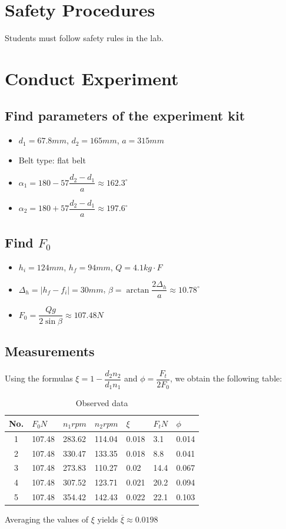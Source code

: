 \section{Safety Procedures}
Students must follow safety rules in the lab.

\section{Conduct Experiment}
\subsection{Find parameters of the experiment kit}
	\begin{itemize}
		\item $ d_1 = 67.8\unit{mm} $, $ d_2 = 165\unit{mm} $, $ a = 315\unit{mm} $
		\item Belt type: flat belt
		\item $ \alpha_1 = 180 - 57\dfrac{d_2-d_1}{a} \approx 162.3^{\circ}$
		\item $ \alpha_2 = 180 + 57\dfrac{d_2-d_1}{a} \approx 197.6^{\circ}$
	\end{itemize}
\subsection{Find $ F_0 $}
	\begin{itemize}
		\item $ h_i = 124\unit{mm}$, $ h_f = 94\unit{mm} $, $ Q = 4.1\unit{kg\cdot F} $
		\item $ \Delta_h=|h_f-f_i|=30\unit{mm} $, $ \beta=\arctan\dfrac{2\Delta_h}{a} \approx 10.78^{\circ}$
		\item $ F_0 = \dfrac{Qg}{2\sin\beta} \approx 107.48\unit{N}$
	\end{itemize}
\subsection{Measurements}
Using the formulas $ \xi=1-\dfrac{d_2n_2}{d_1n_1} $ and $ \phi=\dfrac{F_t}{2F_0} $, we obtain the following table:
\begin{table}[ht]
	\centering
	\begin{tabular}{|c|l|l|l|l|l|l|}\hline
		No. & $ F_0\unit{N}$ & $ n_1\unit{rpm} $ & $ n_2\unit{rpm} $ & $ \xi $ & $ F_t\unit{N} $ & $ \phi $\\\hline
		1 & 107.48 & 283.62 & 114.04 & 0.018 & 3.1 & 0.014\\\hline
		2 & 107.48 & 330.47 & 133.35 & 0.018 & 8.8 & 0.041\\\hline
		3 & 107.48 & 273.83 & 110.27 & 0.02 & 14.4 & 0.067\\\hline
		4 & 107.48 & 307.52 & 123.71 & 0.021 & 20.2 & 0.094\\\hline
		5 & 107.48 & 354.42 & 142.43 & 0.022 & 22.1 & 0.103\\\hline
	\end{tabular}
	\caption{Observed data}
\end{table}
Averaging the values of $ \xi $ yields $ \overline{\xi} \approx 0.0198$
